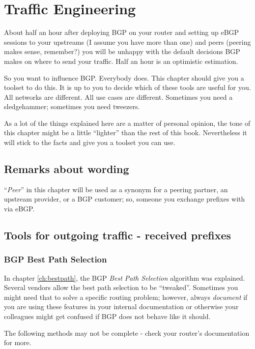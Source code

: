 \chapter{Traffic Engineering}
\label{ch:trafficengineering}
About half an hour after deploying BGP on your router and setting up eBGP sessions to your upstreams (I assume you have more than one) and peers (peering makes sense, remember?) you will be unhappy with the default decisions BGP makes on where to send your traffic. Half an hour is an optimistic estimation.

So you want to influence BGP. Everybody does. This chapter should give you a toolset to do this. It is up to you to decide which of these tools are useful for you. All networks are different. All use cases are different. Sometimes you need a sledgehammer; sometimes you need tweezers.

As a lot of the things explained here are a matter of personal opinion, the tone of this chapter might be a little ``lighter'' than the rest of this book. Nevertheless it will stick to the facts and give you a toolset you can use.

\section{Remarks about wording}
``\emph{Peer}'' in this chapter will be used as a synonym for a peering partner, an upstream provider, or a BGP customer; so, someone you exchange prefixes with via eBGP.

\section{Tools for outgoing traffic - received prefixes}
\subsection{BGP Best Path Selection}
In chapter \ref{ch:bestpath}, the BGP \emph{Best Path Selection} algorithm was explained. Several vendors allow the best path selection to be ``tweaked''. Sometimes you might need that to solve a specific routing problem; however, always \emph{document} if you are using these features in your internal documentation or otherwise your colleagues might get confused if BGP does not behave like it should.

The following methods may not be complete - check your router's documentation for more.


